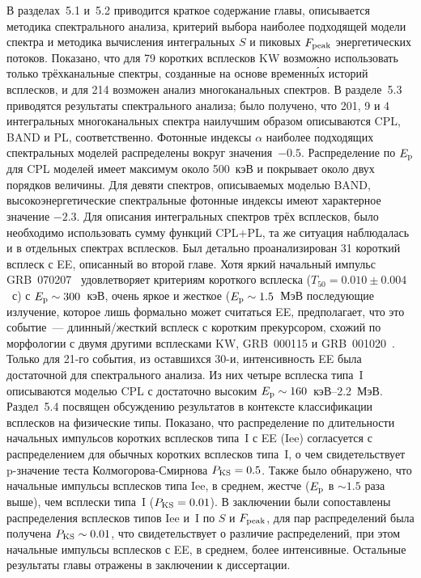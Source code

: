 В разделах~5.1 и~5.2 приводится краткое содержание главы, 
описывается методика спектрального анализа, критерий выбора наиболее подходящей модели спектра
и методика вычисления интегральных $S$ и пиковых $F_{\mathrm{peak}}$ энергетических потоков. 
Показано, что для 79 коротких всплесков KW возможно использовать только трёхканальные спектры, 
созданные на основе временн\'{ы}х историй всплесков, и для 214 возможен анализ многоканальных спектров.
В разделе~5.3 приводятся результаты спектрального анализа; было получено, что 201, 9 и 4 интегральных 
многоканальных спектра наилучшим образом описываются CPL, BAND и PL, соответственно. 
Фотонные индексы $\alpha$ наиболее подходящих спектральных моделей распределены 
вокруг значения~$-0.5$. Распределение по $E_{\mathrm{p}}$ для CPL моделей имеет максимум около 500~кэВ 
и покрывает около двух порядков величины. Для девяти спектров, описываемых моделью BAND,
высокоэнергетические спектральные фотонные индексы имеют характерное значение $-2.3$.
Для описания интегральных спектров трёх всплесков, было необходимо использовать сумму функций 
CPL+PL, та же ситуация наблюдалась и в отдельных спектрах всплесков. 
Был детально проанализирован 31 короткий всплеск с EE, описанный во второй главе.
Хотя яркий начальный импульс GRB~070207~\citep{Golenetskii_2007GCN6089}
удовлетворяет критериям короткого всплеска ($T_{50}=0.010\pm0.004$~с) с $E_{\mathrm{p}}\sim 300$~кэВ,
очень яркое и жесткое ($E_{\mathrm{p}}\sim 1.5$~МэВ последующие излучение, которое лишь формально может
считаться EE, предполагает, что это событие~--- длинный/жесткий всплеск с коротким прекурсором,
схожий по морфологии с двумя другими всплесками KW, GRB~000115 
и GRB~001020~\citep{Hurley_2000GCN859}. 
Только для 21-го события, из оставшихся 30-и, интенсивность EE была достаточной 
для спектрального анализа. Из них четыре всплеска типа~I описываются моделью CPL с 
достаточно высоким $E_{\mathrm{p}} \sim 160$~кэВ--2.2~МэВ.
Раздел~5.4 посвящен обсуждению результатов в контексте классификации всплесков на физические типы.
Показано, что распределение по длительности начальных импульсов коротких всплесков 
типа~I с EE (Iee) согласуется с распределением для обычных коротких всплесков типа~I, 
о чем свидетельствует p-значение теста Колмогорова-Смирнова $P_{\mathrm{KS}}=0.5$. 
Также было обнаружено, что начальные импульсы всплесков типа Iee, в среднем, 
жестче ($E_{\mathrm{p}}$ в $\sim 1.5$ раза выше), чем всплески типа~I ($P_{\mathrm{KS}} = 0.01$). 
В заключении были сопоставлены распределения 
всплесков типов Iee и~I по $S$ и $F_{\mathrm{peak}}$, для пар распределений 
была получена $P_{\mathrm{KS}} \sim 0.01$, что свидетельствует о различие распределений,
при этом начальные импульсы всплесков с EE, в среднем, более интенсивные. 
Остальные результаты главы отражены в заключении к диссертации. 

